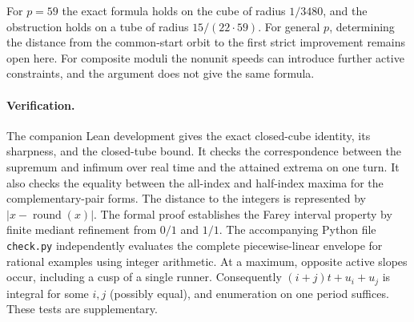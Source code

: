\documentclass[11pt]{article}
\begin{document}
For $p=59$ the exact formula holds on the cube of radius $1/3480$,
and the obstruction holds on a tube of radius $15/(22\cdot59)$.
For general $p$, determining the distance from the common-start orbit
to the first strict improvement remains open here.
For composite moduli the nonunit speeds can introduce further
active constraints, and the argument does not give the same formula.

\paragraph{Verification.}
The companion Lean development gives the exact closed-cube identity,
its sharpness, and the closed-tube bound. It checks the correspondence
between the supremum and infimum over real time and the attained
extrema on one turn. It also checks the equality between the
all-index and half-index maxima for the complementary-pair forms.
The distance to the integers is represented by $\lvert x-\operatorname{round}(x)\rvert$.
The formal proof establishes the Farey interval property by finite
mediant refinement from $0/1$ and $1/1$.
The accompanying Python file
\texttt{check.py} independently evaluates the complete piecewise-linear
envelope for rational examples using integer arithmetic. At a maximum,
opposite active slopes occur, including a cusp of a single runner.
Consequently $(i+j)t+u_i+u_j$ is integral for some $i,j$ (possibly
equal), and enumeration on one period suffices. These tests are
supplementary.
\end{document}
